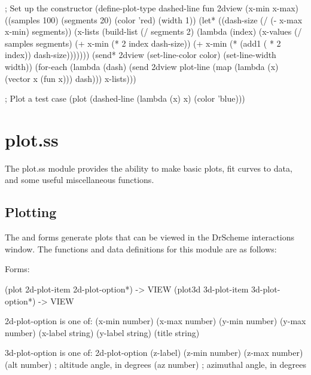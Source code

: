 \documentclass{article}
\begin{document}
{\begin{schemedisplay}
; Set up the constructor
(define-plot-type dashed-line
  fun 2dview (x-min x-max) ((samples 100) (segments 20) (color 'red) (width 1))
  (let* ((dash-size (/ (- x-max x-min) segments))
         (x-lists (build-list 
                   (/ segments 2) 
                   (lambda (index)                                    
                     (x-values 
                      (/ samples segments) 
                      (+ x-min (* 2 index dash-size))
                      (+ x-min (* (add1 ( * 2 index)) dash-size)))))))
    (send* 2dview 
           (set-line-color color)
           (set-line-width width))
    (for-each 
     (lambda (dash)
       (send 2dview plot-line 
              (map (lambda (x) (vector x (fun x))) dash))) 
     x-lists)))

; Plot a test case
(plot (dashed-line (lambda (x) x) (color 'blue)))
\end{schemedisplay}

\pagebreak

\section{plot.ss}

The plot.ss module provides the ability to make basic plots, fit curves to data, and some useful miscellaneous functions.

\subsection{Plotting}


The  and  forms generate plots that can be viewed in the DrScheme interactions window. The functions and data definitions for this  module are as follows:



\begin{schemedisplay}

       
Forms:
       
 (plot 2d-plot-item 2d-plot-option*) -> VIEW
 (plot3d 3d-plot-item 3d-plot-option*) -> VIEW
     
2d-plot-option is one of:
 (x-min number)
 (x-max number)
 (y-min number)
 (y-max number)
 (x-label string)
 (y-label string)
 (title string)
     
3d-plot-option is one of:
 2d-plot-option
 (z-label)
 (z-min number)
 (z-max number)
 (alt number)    ; altitude angle, in degrees
 (az number)     ; azimuthal angle, in degrees
     

\end{schemedisplay}}
\end{document}
